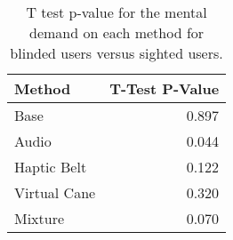 
\begin{table}[!htb]
\centering
\caption{T test p-value for the mental demand on each method for blinded users versus sighted users.}
\label{tab:ttest_mental_demand}
\begin{tabular}{lr}
\toprule
      Method &  T-Test P-Value \\
\midrule
        Base &           0.897 \\
       Audio &           0.044 \\
 Haptic Belt &           0.122 \\
Virtual Cane &           0.320 \\
     Mixture &           0.070 \\
\bottomrule
\end{tabular}
\end{table}

